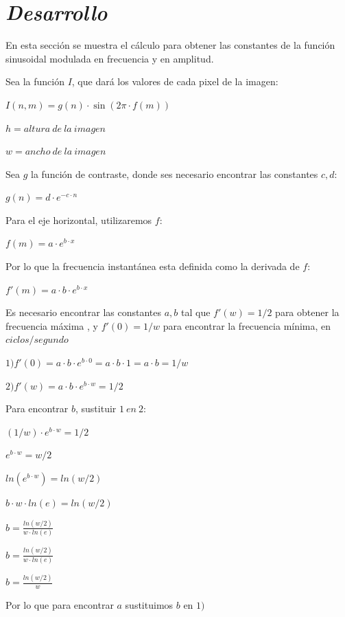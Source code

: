 \documentclass[conference]{IEEEtran}
\def\shadowLine{\vspace{3mm}}
\begin{document}
\section{\textit{Desarrollo}}

En esta sección se muestra el cálculo para obtener las constantes de la función sinusoidal modulada en frecuencia y en amplitud.

Sea la función $I$, que dará los valores de cada pixel de la imagen:

$I(n,m) = g(n)\cdot \sin(2\pi\cdot f(m))$

$h = altura\ de\ la\ imagen$

$w =  ancho\ de\ la\ imagen$

Sea $g$ la función de contraste, donde ses necesario encontrar las constantes $c,d$:

$g(n)=d\cdot e^{-c\cdot n}$

Para el eje horizontal, utilizaremos $f$:

$f(m) = a\cdot e^{b\cdot x}$

Por lo que la frecuencia instantánea esta definida como la derivada de $f$:

$f'(m) = a\cdot b\cdot e^{b\cdot x}$

Es necesario encontrar las constantes $a,b$ tal que $f'(w) = 1/2$ para obtener la frecuencia máxima , y $f'(0) = 1/w$ para encontrar la frecuencia mínima, en $ciclos/segundo$

$1)f'(0) = a\cdot b\cdot e^{b\cdot 0} = a\cdot b \cdot 1= a\cdot b = 1/w$

$2)f'(w) = a\cdot b\cdot e^{b\cdot w} = 1/2$

Para encontrar $b$, sustituir $1\ en\ 2$:

$(1/w)\cdot e^{b\cdot w} = 1/2$

\shadowLine
$e^{b\cdot w} = w/2$

\shadowLine
$ln(e^{b\cdot w}) = ln(w/2)$

\shadowLine
$b\cdot w\cdot ln(e) = ln(w/2)$

\shadowLine
$b = \displaystyle\frac{ln(w/2)}{w\cdot ln(e)}  $

\shadowLine
$b = \displaystyle\frac{ln(w/2)}{w\cdot ln(e)}  $

\shadowLine
$b = \displaystyle\frac{ln(w/2)}{w}  $

Por lo que para encontrar $a$ sustituimos $b$ en $1)$
\end{document}
